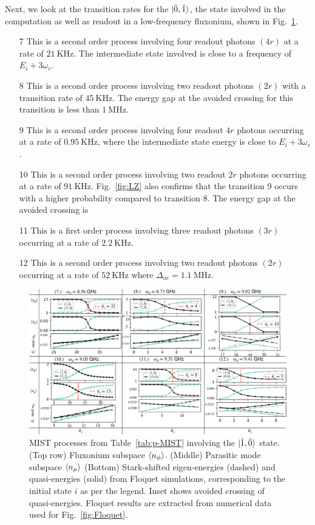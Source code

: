 \documentclass[%
reprint,
superscriptaddress,
 amsmath,amssymb,
 aps,
 prx,
longbibliography,
floatfix,
]{revtex4-2}
\begin{document}
Next, we look at the transition rates for the $\ket{\tilde{0},\tilde{1}}$, the state involved in the computation as well as readout in a low-frequency fluxonium, shown in Fig.~\ref{fig:Trans1}.
\begin{itemize}
    \item[7] This is a second order process involving four readout photons $(4r)$ at a rate of $21 \ \mathrm{KHz}$. The intermediate state involved is close to a frequency of $E_i+3\omega_r$.
    \item[8] This is a second order process involving two readout photons $(2r)$ with a transition rate of $45 \ \mathrm{KHz}$. The energy gap at the avoided crossing for this transition is less than $1 \ \mathrm{MHz}$. 
    \item[9] This is a second order process involving four readout $4r$ photons occurring at a rate of $0.95 \ \mathrm{KHz}$, where the intermediate state energy is close to $E_i+3\omega_r$. 
    \item[10] This is a second order process involving two readout $2r$ photons occurring at a rate of $91 \ \mathrm{KHz}$. Fig.~\ref{fig:LZ} also confirms that the transition 9 occurs with a higher probability compared to transition 8. The energy gap at the avoided crossing is
    \item[11] This is a first order process involving three readout photons $(3r)$ occurring at a rate of $2.2 \ \mathrm{KHz}$. 
    \item[12] This is a second order process involving two readout photons $(2r)$ occurring at a rate of $52 \ \mathrm{KHz}$ where $\Delta_{ac}=1.1 \ \mathrm{MHz}$.
\end{itemize}
\begin{figure}
    \centering
    \includegraphics[width=1.0\textwidth]{Figures/Trans1.pdf}
    \caption{MIST processes from Table~\ref{tab:p-MIST} involving the $\ket{\tilde{1},\tilde{0}}$ state. (Top row) Fluxonium subspace $\braket{n_\phi}$. (Middle) Parasitic mode subspace $\braket{n_\mu}$ (Bottom) Stark-shifted eigen-energies (dashed) and quasi-energies (solid) from Floquet simulations, corresponding to the initial state $i$ as per the legend. Inset shows avoided crossing of quasi-energies. Floquet results are extracted from numerical data used for Fig.~\ref{fig:Floquet}.}
    \label{fig:Trans1}
\end{figure}
\end{document}
